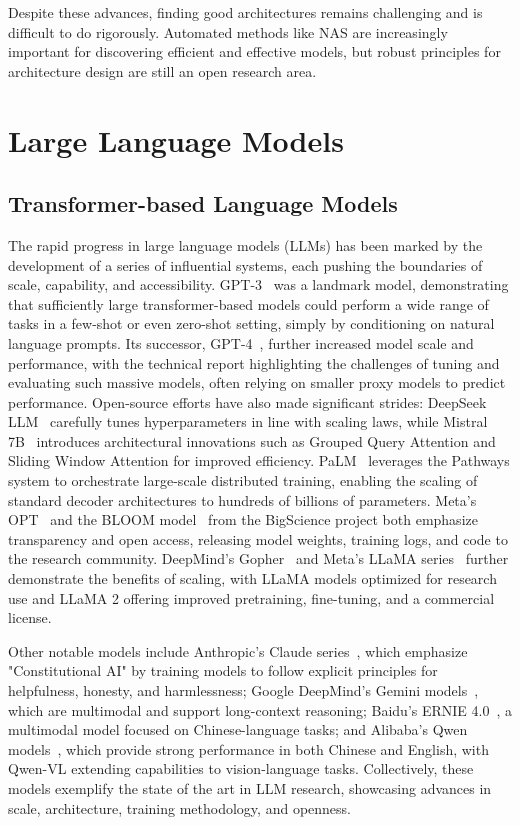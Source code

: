 Despite these advances, finding good architectures remains challenging and is difficult to do rigorously. Automated methods like NAS are increasingly important for discovering efficient and effective models, but robust principles for architecture design are still an open research area.

\section{Large Language Models}

\subsection{Transformer-based Language Models}

The rapid progress in large language models (LLMs) has been marked by the development of a series of influential systems, each pushing the boundaries of scale, capability, and accessibility. GPT-3~\citep{brown2020gpt3} was a landmark model, demonstrating that sufficiently large transformer-based models could perform a wide range of tasks in a few-shot or even zero-shot setting, simply by conditioning on natural language prompts. Its successor, GPT-4~\citep{openai2023gpt4}, further increased model scale and performance, with the technical report highlighting the challenges of tuning and evaluating such massive models, often relying on smaller proxy models to predict performance. Open-source efforts have also made significant strides: DeepSeek LLM~\citep{deepseek2024llm} carefully tunes hyperparameters in line with scaling laws, while Mistral 7B~\citep{jiang2023mistral} introduces architectural innovations such as Grouped Query Attention and Sliding Window Attention for improved efficiency. PaLM~\citep{chowdhery2023palm} leverages the Pathways system to orchestrate large-scale distributed training, enabling the scaling of standard decoder architectures to hundreds of billions of parameters. Meta's OPT~\citep{zhang2022opt} and the BLOOM model~\citep{le2023bloom} from the BigScience project both emphasize transparency and open access, releasing model weights, training logs, and code to the research community. DeepMind's Gopher~\citep{rae2021scaling}  and Meta's LLaMA series~\citep{touvron2023llama} further demonstrate the benefits of scaling, with LLaMA models optimized for research use and LLaMA 2 offering improved pretraining, fine-tuning, and a commercial license.

Other notable models include Anthropic's Claude series~\citep{anthropic2024claude3,anthropic2024claude35,anthropic2025claude37}, which emphasize "Constitutional AI" by training models to follow explicit principles for helpfulness, honesty, and harmlessness; Google DeepMind's Gemini models~\citep{deepmind2023gemini}, which are multimodal and support long-context reasoning; Baidu's ERNIE 4.0~\citep{baidu2023ernie4}, a multimodal model focused on Chinese-language tasks; and Alibaba's Qwen models~\citep{alibaba2023qwen}, which provide strong performance in both Chinese and English, with Qwen-VL extending capabilities to vision-language tasks. Collectively, these models exemplify the state of the art in LLM research, showcasing advances in scale, architecture, training methodology, and openness.


